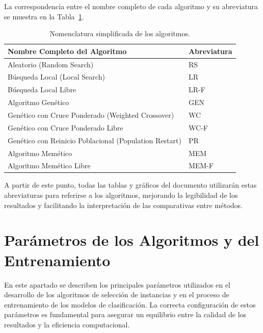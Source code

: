 La correspondencia entre el nombre completo de cada algoritmo y su abreviatura se muestra en la Tabla~\ref{tab:nombres-algoritmos}.

\begin{table}[htp]
    \centering
    \begin{tabular}{ll}
        \toprule
        \textbf{Nombre Completo del Algoritmo}                 & \textbf{Abreviatura} \\
        \midrule
        Aleatorio (Random Search)                              & RS                   \\
        Búsqueda Local (Local Search)                          & LR                   \\
        Búsqueda Local Libre                                   & LR-F                 \\
        Algoritmo Genético                                     & GEN                  \\
        Genético con Cruce Ponderado (Weighted Crossover)      & WC                   \\
        Genético con Cruce Ponderado Libre                     & WC-F                 \\
        Genético con Reinicio Poblacional (Population Restart) & PR                   \\
        Algoritmo Memético                                     & MEM                  \\
        Algoritmo Memético Libre                               & MEM-F                \\
        \bottomrule
    \end{tabular}
    \caption{Nomenclatura simplificada de los algoritmos.}
    \label{tab:nombres-algoritmos}
\end{table}

A partir de este punto, todas las tablas y gráficos del documento utilizarán estas abreviaturas para referirse a los algoritmos,
mejorando la legibilidad de los resultados y facilitando la interpretación de las comparativas entre métodos.


\section{Parámetros de los Algoritmos y del Entrenamiento}\label{subsec:parametros-algoritmos}
En este apartado se describen los principales parámetros utilizados en el desarrollo de los algoritmos de 
selección de instancias y en el proceso de entrenamiento de los modelos de clasificación.
La correcta configuración de estos parámetros es fundamental para asegurar un equilibrio entre la calidad de los resultados y la eficiencia computacional.

